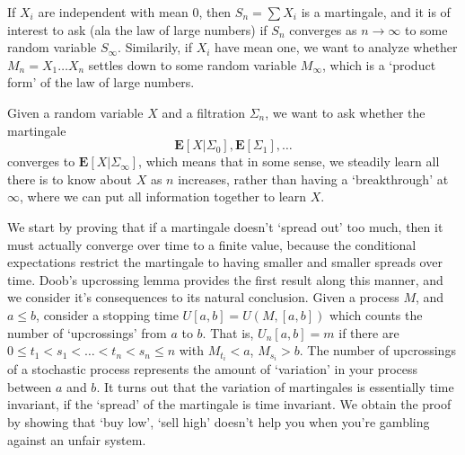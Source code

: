 \begin{example}
    If $X_i$ are independent with mean $0$, then $S_n = \sum X_i$ is a martingale, and it is of interest to ask (ala the law of large numbers) if $S_n$ converges as $n \to \infty$ to some random variable $S_\infty$. Similarily, if $X_i$ have mean one, we want to analyze whether $M_n = X_1 \dots X_n$ settles down to some random variable $M_\infty$, which is a `product form' of the law of large numbers.
\end{example}

\begin{example}
    Given a random variable $X$ and a filtration $\Sigma_n$, we want to ask whether the martingale
    \[ \mathbf{E}[X|\Sigma_0], \mathbf{E}[\Sigma_1], \dots \]
    converges to $\mathbf{E}[X|\Sigma_\infty]$, which means that in some sense, we steadily learn all there is to know about $X$ as $n$ increases, rather than having a `breakthrough' at $\infty$, where we can put all information together to learn $X$.
\end{example}

We start by proving that if a martingale doesn't `spread out' too much, then it must actually converge over time to a finite value, because the conditional expectations restrict the martingale to having smaller and smaller spreads over time. Doob's upcrossing lemma provides the first result along this manner, and we consider it's consequences to its natural conclusion. Given a process $M$, and $a \leq b$, consider a stopping time $U[a,b] = U(M,[a,b])$ which counts the number of `upcrossings' from $a$ to $b$. That is, $U_n[a,b] = m$ if there are $0 \leq t_1 < s_1 < \dots < t_n < s_n \leq n$ with $M_{t_i} < a$, $M_{s_i} > b$. The number of upcrossings of a stochastic process represents the amount of `variation' in your process between $a$ and $b$. It turns out that the variation of martingales is essentially time invariant, if the `spread' of the martingale is time invariant. We obtain the proof by showing that `buy low', `sell high' doesn't help you when you're gambling against an unfair system.


